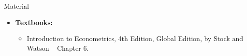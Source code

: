 \documentclass[notes,10pt, aspectratio=169]{beamer}
\begin{document}
\begin{frame}[allowframebreaks]{Material}
\begin{itemize}
    \item[--] \textbf{Textbooks:}
    \begin{itemize}
        \item Introduction to Econometrics, 4th Edition, Global Edition, by Stock and Watson -- Chapter 6.
    \end{itemize}
\end{itemize}
\end{frame}
\end{document}
